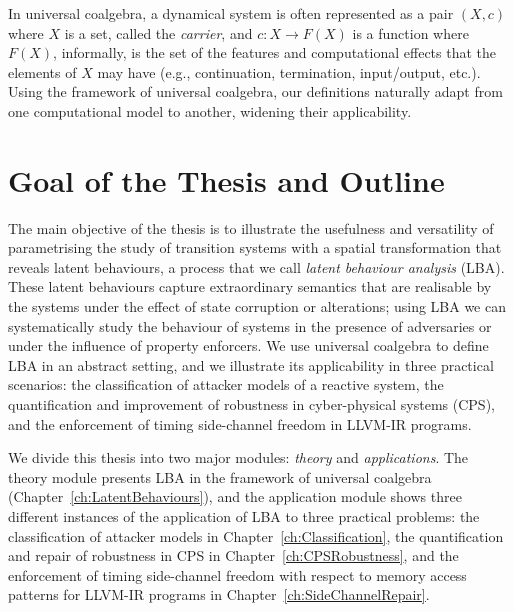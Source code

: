 In universal coalgebra, a dynamical system is often represented as a pair $(X,c)$ where $X$ is a set, called the \emph{carrier}, and $c\colon X\rightarrow F(X)$ is a function where $F(X)$, informally, is the set of the features and computational effects that the elements of $X$ may have (e.g., continuation, termination, input/output, etc.). Using the framework of universal coalgebra, our definitions naturally adapt from one computational model to another, widening their applicability. 




\section{Goal of the Thesis and Outline}
\label{sec:Introduction:Goal}
The main objective of the thesis is to illustrate the usefulness and versatility of parametrising the study of transition systems with a spatial transformation that reveals latent behaviours, a process that we call \emph{latent behaviour analysis} (LBA). These latent behaviours capture extraordinary semantics that are realisable by the systems under the effect of state corruption or alterations; using LBA we can systematically study the behaviour of systems in the presence of adversaries or under the influence of property enforcers. We use universal coalgebra to define LBA in an abstract setting, and we illustrate its applicability in three practical scenarios: the classification of attacker models of a reactive system, the quantification and improvement of robustness in cyber-physical systems (CPS), and the enforcement of timing side-channel freedom in LLVM-IR programs. 

We divide this thesis into two major modules: \emph{theory} and \emph{applications}. The theory module presents LBA in the framework of universal coalgebra (Chapter~\ref{ch:LatentBehaviours}), and the application module shows three different instances of the application of LBA to three practical problems: the classification of attacker models in Chapter~\ref{ch:Classification}, the quantification and repair of robustness in CPS in Chapter~\ref{ch:CPSRobustness}, and the enforcement of timing side-channel freedom with respect to memory access patterns for LLVM-IR programs in Chapter~\ref{ch:SideChannelRepair}.

